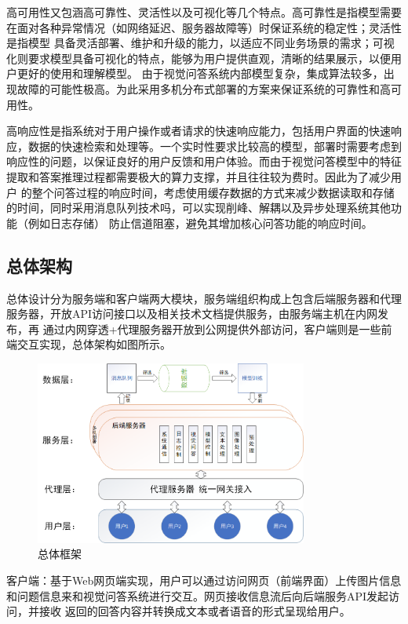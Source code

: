 高可用性又包涵高可靠性、灵活性以及可视化等几个特点。高可靠性是指模型需要在面对各种异常情况（如网络延迟、服务器故障等）时保证系统的稳定性；灵活性是指模型
具备灵活部署、维护和升级的能力，以适应不同业务场景的需求；可视化则要求模型具备可视化的特点，能够为用户提供直观，清晰的结果展示，以便用户更好的使用和理解模型。
由于视觉问答系统内部模型复杂，集成算法较多，出现故障的可能性极高。为此采用多机分布式部署的方案来保证系统的可靠性和高可用性。

高响应性是指系统对于用户操作或者请求的快速响应能力，包括用户界面的快速响应，数据的快速检索和处理等。一个实时性要求比较高的模型，部署时需要考虑到
响应性的问题，以保证良好的用户反馈和用户体验。而由于视觉问答模型中的特征提取和答案推理过程都需要极大的算力支撑，并且往往较为费时。因此为了减少用户
的整个问答过程的响应时间，考虑使用缓存数据的方式来减少数据读取和存储的时间，同时采用消息队列技术吗，可以实现削峰、解耦以及异步处理系统其他功能（例如日志存储）
防止信道阻塞，避免其增加核心问答功能的响应时间。

\subsection{总体架构}
总体设计分为服务端和客户端两大模块，服务端组织构成上包含后端服务器和代理服务器，开放API访问接口以及相关技术文档提供服务，由服务端主机在内网发布，再
通过内网穿透+代理服务器开放到公网提供外部访问，客户端则是一些前端交互实现，总体架构如图所示。
\begin{figure}[htbp]
	\centering	
	\includegraphics[width=0.8\textwidth]{Fig/myfig/chapter5/sys_framwork.png}  %
	\caption{\label{sys_framwork}总体框架} 
\end{figure}
客户端：基于Web网页端实现，用户可以通过访问网页（前端界面）上传图片信息和问题信息来和视觉问答系统进行交互。网页接收信息流后向后端服务API发起访问，并接收
返回的回答内容并转换成文本或者语音的形式呈现给用户。

